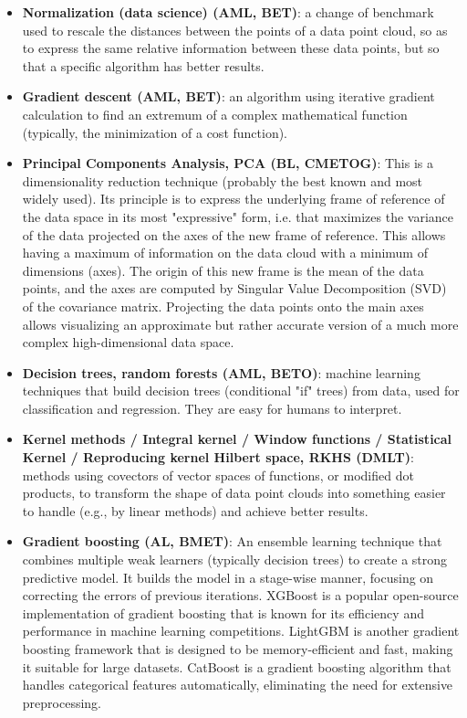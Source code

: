 \documentclass{article}
\begin{document}
\begin{itemize}

	\item \textbf{Normalization (data science) (AML, BET)}: a change of benchmark used to rescale the distances between the points of a data point cloud, so as to express the same relative information between these data points, but so that a specific algorithm has better results.

	\item \textbf{Gradient descent (AML, BET)}: an algorithm using iterative gradient calculation to find an extremum of a complex mathematical function (typically, the minimization of a cost function).

	\item \textbf{Principal Components Analysis, PCA (BL, CMETOG)}: This is a dimensionality reduction technique (probably the best known and most widely used). Its principle is to express the underlying frame of reference of the data space in its most "expressive" form, i.e. that maximizes the variance of the data projected on the axes of the new frame of reference. This allows having a maximum of information on the data cloud with a minimum of dimensions (axes). The origin of this new frame is the mean of the data points, and the axes are computed by Singular Value Decomposition (SVD) of the covariance matrix. Projecting the data points onto the main axes allows visualizing an approximate but rather accurate version of a much more complex high-dimensional data space.

	\item \textbf{Decision trees, random forests (AML, BETO)}: machine learning techniques that build decision trees (conditional "if" trees) from data, used for classification and regression. They are easy for humans to interpret.

	\item \textbf{Kernel methods / Integral kernel / Window functions / Statistical Kernel / Reproducing kernel Hilbert space, RKHS (DMLT)}: methods using covectors of vector spaces of functions, or modified dot products, to transform the shape of data point clouds into something easier to handle (e.g., by linear methods) and achieve better results.

	\item \textbf{Gradient boosting (AL, BMET)}: An ensemble learning technique that combines multiple weak learners (typically decision trees) to create a strong predictive model. It builds the model in a stage-wise manner, focusing on correcting the errors of previous iterations. XGBoost is a popular open-source implementation of gradient boosting that is known for its efficiency and performance in machine learning competitions. LightGBM is another gradient boosting framework that is designed to be memory-efficient and fast, making it suitable for large datasets. CatBoost is a gradient boosting algorithm that handles categorical features automatically, eliminating the need for extensive preprocessing.


\end{itemize}
\end{document}
